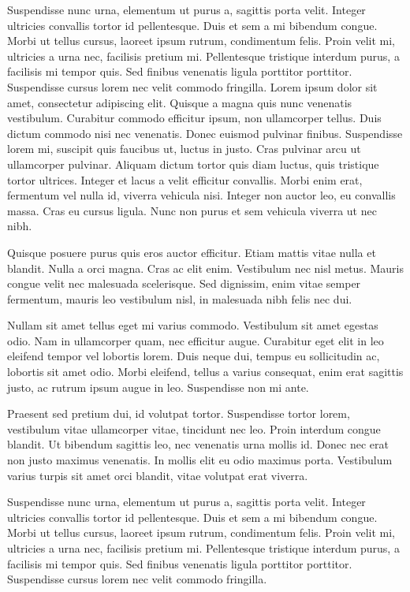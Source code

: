 Suspendisse nunc urna, elementum ut purus a, sagittis porta velit. Integer ultricies convallis tortor id pellentesque. Duis et sem a mi bibendum congue. Morbi ut tellus cursus, laoreet ipsum rutrum, condimentum felis. Proin velit mi, ultricies a urna nec, facilisis pretium mi. Pellentesque tristique interdum purus, a facilisis mi tempor quis. Sed finibus venenatis ligula porttitor porttitor. Suspendisse cursus lorem nec velit commodo fringilla.
Lorem ipsum dolor sit amet, consectetur adipiscing elit. Quisque a magna quis nunc venenatis vestibulum. Curabitur commodo efficitur ipsum, non ullamcorper tellus. Duis dictum commodo nisi nec venenatis. Donec euismod pulvinar finibus. Suspendisse lorem mi, suscipit quis faucibus ut, luctus in justo. Cras pulvinar arcu ut ullamcorper pulvinar. Aliquam dictum tortor quis diam luctus, quis tristique tortor ultrices. Integer et lacus a velit efficitur convallis. Morbi enim erat, fermentum vel nulla id, viverra vehicula nisi. Integer non auctor leo, eu convallis massa. Cras eu cursus ligula. Nunc non purus et sem vehicula viverra ut nec nibh.

Quisque posuere purus quis eros auctor efficitur. Etiam mattis vitae nulla et blandit. Nulla a orci magna. Cras ac elit enim. Vestibulum nec nisl metus. Mauris congue velit nec malesuada scelerisque. Sed dignissim, enim vitae semper fermentum, mauris leo vestibulum nisl, in malesuada nibh felis nec dui.

Nullam sit amet tellus eget mi varius commodo. Vestibulum sit amet egestas odio. Nam in ullamcorper quam, nec efficitur augue. Curabitur eget elit in leo eleifend tempor vel lobortis lorem. Duis neque dui, tempus eu sollicitudin ac, lobortis sit amet odio. Morbi eleifend, tellus a varius consequat, enim erat sagittis justo, ac rutrum ipsum augue in leo. Suspendisse non mi ante.

Praesent sed pretium dui, id volutpat tortor. Suspendisse tortor lorem, vestibulum vitae ullamcorper vitae, tincidunt nec leo. Proin interdum congue blandit. Ut bibendum sagittis leo, nec venenatis urna mollis id. Donec nec erat non justo maximus venenatis. In mollis elit eu odio maximus porta. Vestibulum varius turpis sit amet orci blandit, vitae volutpat erat viverra.

Suspendisse nunc urna, elementum ut purus a, sagittis porta velit. Integer ultricies convallis tortor id pellentesque. Duis et sem a mi bibendum congue. Morbi ut tellus cursus, laoreet ipsum rutrum, condimentum felis. Proin velit mi, ultricies a urna nec, facilisis pretium mi. Pellentesque tristique interdum purus, a facilisis mi tempor quis. Sed finibus venenatis ligula porttitor porttitor. Suspendisse cursus lorem nec velit commodo fringilla.
